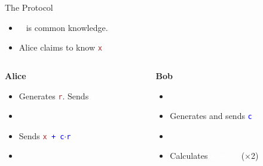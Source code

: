 \documentclass[dvipsnames]{beamer}
\newcommand{\pub}[1]{\textcolor{blue}{\texttt{#1}}}
\newcommand{\priv}[1]{\textcolor{brown}{\texttt{#1}}}
\newcommand{\enc}[1]{\colorbox{RubineRed}{\textcolor{white}{\texttt{#1}}}}
\begin{document}
    \begin{frame}{The Protocol}
        \begin{itemize}
            \item \enc{x} is common knowledge.
            \item Alice claims to know \priv{x}
        \end{itemize}
        \vspace{1cm}

        \begin{columns}
            \begin{column}{0.5\textwidth}
                \textbf{Alice}
                \begin{itemize}
                    \item Generates \priv{r}. Sends \enc{r}
                    \item[]
                    \item Sends \pub{\priv{x} + c$\cdot$r}
                    \item[]
                \end{itemize}
            \end{column}
            \begin{column}{0.5\textwidth}  %
                \textbf{Bob}
                \begin{itemize}
                    \item[]
                    \item Generates and sends \pub{c}
                    \item[]
                    \item Calculates \enc{x + c$\cdot$r} ($\times$2)
                \end{itemize}
            \end{column}
        \end{columns}
    \end{frame}
\end{document}
